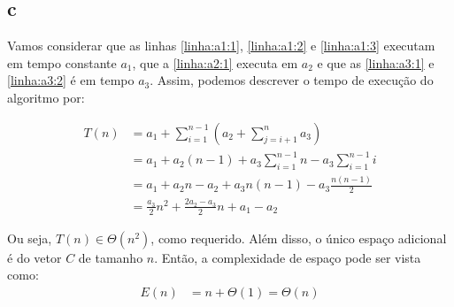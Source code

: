 \subsection{c}

Vamos considerar que as linhas \ref{linha:a1:1}, \ref{linha:a1:2} e \ref{linha:a1:3} executam em tempo constante $a_1$, que a \ref{linha:a2:1} executa em $a_2$ e que as \ref{linha:a3:1} e \ref{linha:a3:2} é em tempo $a_3$. Assim, podemos descrever o tempo de execução do algoritmo por:

\begin{align*}
    T(n) &= a_1 + \sum_{i = 1}^{n - 1}\left(a_2 + \sum_{j = i + 1}^n a_3\right) \\
    &= a_1 + a_2 (n - 1) + a_3 \sum_{i = 1}^{n - 1} n - a_3 \sum_{i = 1}^{n - 1} i \\
    &= a_1 + a_2 n - a_2 + a_3 n (n - 1) - a_3 \frac{n (n - 1)}{2} \\
    &= \frac{a_3}{2} n^2 + \frac{2 a_2 - a_3}{2} n + a_1 - a_2
\end{align*}

Ou seja, $T(n) \in \Theta\left(n^2\right)$, como requerido. Além disso, o único espaço adicional é do vetor $C$ de tamanho $n$. Então, a complexidade de espaço pode ser vista como:
\begin{align*}
    E(n) &= n + \Theta(1) = \Theta(n)
\end{align*}
